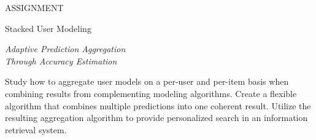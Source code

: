 \null\vspace{6em}

{
  \centering
  \color{gray}
  ASSIGNMENT
  \color{black}
  \vspace{1em}
  
  \LARGE{Stacked User Modeling}\\
  \vspace{1em}
  
  \itshape
  \large{Adaptive Prediction Aggregation}\\
  \large{Through Accuracy Estimation}\\
}

\vspace{3em}

Study how to aggregate user models on a per-user and per-item
basis when combining results from complementing modeling algorithms.
Create a flexible algorithm that combines multiple predictions
into one coherent result.
Utilize the resulting aggregation algorithm
to provide personalized search in an information retrieval system.

\vfill

